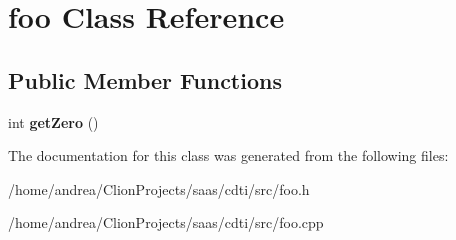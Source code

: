 \hypertarget{classfoo}{}\section{foo Class Reference}
\label{classfoo}
\subsection*{Public Member Functions}
\begin{DoxyCompactItemize}
\item 
int {\bfseries get\+Zero} ()\hypertarget{classfoo_a86a78c0e319fbd776c8355cfb6103bd4}{}\label{classfoo_a86a78c0e319fbd776c8355cfb6103bd4}

\end{DoxyCompactItemize}


The documentation for this class was generated from the following files\+:\begin{DoxyCompactItemize}
\item 
/home/andrea/\+Clion\+Projects/saas/cdti/src/foo.\+h\item 
/home/andrea/\+Clion\+Projects/saas/cdti/src/foo.\+cpp\end{DoxyCompactItemize}
